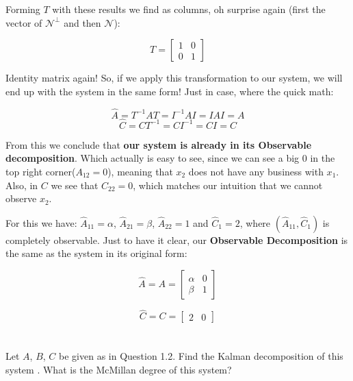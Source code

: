 \documentclass[10pt,a4paper]{article}
\begin{document}
\begin{center}
\end{center}

Forming $T$ with these results we find as columns, oh surprise again (first the vector of $\mathcal{N}^{\perp}$ and then $\mathcal{N}$):

\[
T =
\begin{bmatrix}
1 & 0  \\
0 & 1
\end{bmatrix}
\]


Identity matrix again! So, if we apply this transformation to our system, we will end up with the system in the same form! Just in case, where the quick math:

\[ \hat{A} = T^{-1}AT = I^{-1}AI = IAI = A \]
\[ \hat{C} = CT^{-1} = CI^{-1} = CI = C \]

From this we conclude that \textbf{our system is already in its Observable decomposition}. Which actually is easy to see, since we can see a big $0$ in the top right corner($A_{12} = 0$), meaning that $x_{2}$ does not have any business with $x_{1}$. Also, in $C$ we see that $C_{22} = 0$, which matches our intuition that we cannot observe $x_{2}$.
\medskip

For this we have: $\hat{A}_{11} = \alpha$, $\hat{A}_{21} = \beta$, $\hat{A}_{22} = 1$ and $\hat{C}_{1} = 2$, where $(\hat{A}_{11}, \hat{C}_{1})$ is completely observable. Just to have it clear, our \textbf{Observable Decomposition} is the same as the system in its original form:

\[ \hat{A} = A =
\begin{bmatrix}
\alpha & 0 \\
\beta & 1
\end{bmatrix}
\]

\[ \hat{C} = C =
\begin{bmatrix}
2 & 0
\end{bmatrix}
\]

\section{}
Let $A$, $B$, $C$ be given as in Question 1.2. Find the Kalman decomposition of this system . What is the McMillan degree of this system?
\end{document}
